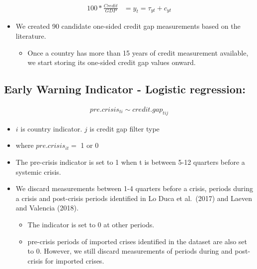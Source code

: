 \documentclass[
  12pt,
]{article}
\providecommand{\tightlist}{%
  \setlength{\itemsep}{0pt}\setlength{\parskip}{0pt}}
\begin{document}
\begin{align}
    100*\frac{Credit}{GDP} &= y_t = \tau_{yt} + c_{yt}
\end{align}

\begin{itemize}
\tightlist
\item
  We created 90 candidate one-sided credit gap measurements based on the literature.

  \begin{itemize}
  \tightlist
  \item
    Once a country has more than 15 years of credit measurement available, we start storing its one-sided credit gap values onward.
  \end{itemize}
\end{itemize}

\hypertarget{early-warning-indicator---logistic-regression}{%
\subsection{Early Warning Indicator - Logistic regression:}\label{early-warning-indicator---logistic-regression}}

\begin{align}
  pre.crisis_{ti} \sim credit.gap_{tij}
\end{align}

\begin{itemize}
\item
  \(i\) is country indicator. \(j\) is credit gap filter type
\item
  where \(pre.crisis_{it}=\) 1 or 0
\item
  The pre-crisis indicator is set to 1 when t is between 5-12 quarters before a systemic crisis.
\item
  We discard measurements between 1-4 quarters before a crisis, periods during a crisis and post-crisis periods identified in Lo Duca et al.~(2017) and Laeven and Valencia (2018).

  \begin{itemize}
  \tightlist
  \item
    The indicator is set to 0 at other periods.
  \item
    pre-crisis periods of imported crises identified in the dataset are also set to 0. However, we still discard measurements of periods during and post-crisis for imported crises.
  \end{itemize}
\end{itemize}
\end{document}
